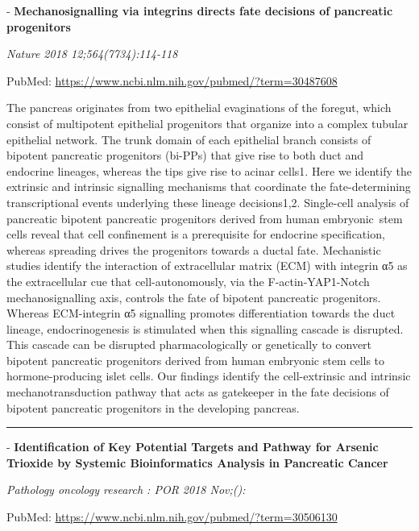 \documentclass[]{article}
\begin{document}
 - \textbf{Mechanosignalling via integrins directs fate decisions of
pancreatic progenitors}

\emph{Nature 2018 12;564(7734):114-118}

PubMed: \url{https://www.ncbi.nlm.nih.gov/pubmed/?term=30487608}

The pancreas originates from two epithelial evaginations of the foregut,
which consist of multipotent epithelial progenitors that organize into a
complex tubular epithelial network. The trunk domain of each epithelial
branch consists of bipotent pancreatic progenitors (bi-PPs) that give
rise to both duct and endocrine lineages, whereas the tips give rise to
acinar cells1. Here we identify the extrinsic and intrinsic signalling
mechanisms that coordinate the fate-determining transcriptional events
underlying these lineage decisions1,2. Single-cell analysis of
pancreatic bipotent pancreatic progenitors derived from human
embryonic~stem cells reveal that cell confinement is a prerequisite for
endocrine specification, whereas spreading drives the progenitors
towards a ductal fate. Mechanistic studies identify the interaction of
extracellular matrix (ECM) with integrin α5 as the extracellular cue
that cell-autonomously, via the F-actin-YAP1-Notch mechanosignalling
axis, controls the fate of bipotent pancreatic progenitors. Whereas
ECM-integrin α5 signalling promotes differentiation towards the duct
lineage, endocrinogenesis is stimulated when this signalling cascade is
disrupted. This cascade can be disrupted pharmacologically or
genetically to convert bipotent pancreatic progenitors derived from
human embryonic stem cells to hormone-producing islet cells. Our
findings identify the cell-extrinsic and intrinsic mechanotransduction
pathway that acts as gatekeeper in the fate decisions of bipotent
pancreatic progenitors in the developing pancreas.

{}

{}

\begin{center}\rule{0.5\linewidth}{\linethickness}\end{center}

 - \textbf{Identification of Key Potential Targets and Pathway for
Arsenic Trioxide by Systemic Bioinformatics Analysis in Pancreatic
Cancer}

\emph{Pathology oncology research : POR 2018 Nov;():}

PubMed: \url{https://www.ncbi.nlm.nih.gov/pubmed/?term=30506130}
\end{document}
